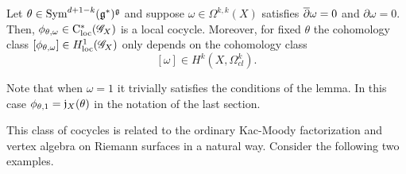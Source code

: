 \documentclass[10pt]{amsart}
\begin{document}
\begin{lem}\label{lem: cocycle KM}
Let $\theta \in {\rm Sym}^{d+1-k}(\mathfrak g^*)^\mathfrak g$ and suppose $\omega \in \Omega^{k,k}(X)$ satisfies $\overline{\partial} \omega = 0$ and $\partial \omega = 0$. 
Then, $\phi_{\theta, \omega} \in {\rm C}_{\rm loc}^*(\mathscr G_X)$ is a local cocycle. 
Moreover, for fixed $\theta$ the cohomology class $[\phi_{\theta,\omega}] \in H^1_{\rm loc}(\mathscr G_X)$ only depends on the cohomology class 
\[
[\omega] \in H^{k}(X , \Omega^k_{cl}) .
\]
\end{lem}

Note that when $\omega = 1$ it trivially satisfies the conditions of the lemma. 
In this case $\phi_{\theta, 1} = \mathfrak j_X(\theta)$ in the notation of the last section. 

This class of cocycles is related to the ordinary Kac-Moody factorization and vertex algebra on Riemann surfaces in a natural way.
Consider the following two examples. 
\end{document}
